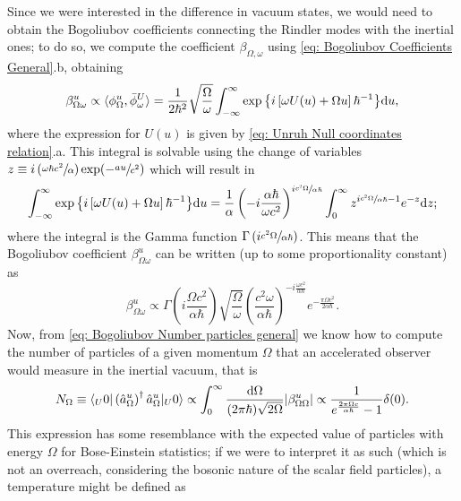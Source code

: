 Since we were interested in the difference in vacuum states, we would need to obtain the Bogoliubov coefficients connecting the Rindler modes with the inertial ones; to do so, we compute the coefficient $\beta_{\Omega,\omega}$ using \ref{eq: Bogoliubov Coefficients General}.b, obtaining
\begin{equation}
	\beta_{\Omega\omega}^u\propto \langle \phi^u_\Omega,\bar\phi_\omega^{U}\rangle=\frac{1}{2\hbar^2}\sqrt{\frac{\Omega}{\omega}}\int_{-\infty}^\infty\exp{\left\{i\left[\omega U(u)+\Omega u\right]\hbar^{-1}\right\}}\text{d} u,
\end{equation}
where the expression for $U(u)$ is given by \ref{eq: Unruh Null coordinates relation}.a. This integral is solvable using the change of variables $z\equiv i\left(\sfrac{\omega\hbar c^2}{\alpha}\right)\exp{\!\left(-\sfrac{a u}{c^2}\right)}$ which will result in
\begin{equation}
	\int_{-\infty}^\infty\exp{\left\{i\left[\omega U(u)+\Omega u\right]\hbar^{-1}\right\}}\text{d} u=\frac{1}{\alpha}\left(-i\frac{\alpha\hbar}{\omega c^2}\right)^{i\sfrac{c^2\Omega}{\alpha\hbar}}\int^\infty_0z^{i\sfrac{c^2\Omega}{\alpha\hbar}-1}e^{-z}\text{d} z;
\end{equation}
where the integral is the Gamma function $\Gamma\left(i\sfrac{c^2\Omega}{\alpha\hbar}\right)$. This means that the Bogoliubov coefficient $\beta_{\Omega\omega}^u$ can be written (up to some proportionality constant) as
\begin{equation}
	\beta_{\Omega\omega}^u\propto \Gamma\left(i\frac{\Omega c^2}{\alpha\hbar }\right)\sqrt{\frac{\Omega}{\omega}}\left(\frac{c^2\omega}{\alpha\hbar }\right)^{-i\frac{\omega c^2}{\alpha\hbar}}e^{-\frac{\pi\Omega c^2}{2\alpha\hbar}}.
\end{equation}
Now, from \ref{eq: Bogoliubov Number particles general} we know how to compute the number of particles of a given momentum $\Omega$ that an accelerated observer would measure in the inertial vacuum, that is
\begin{equation}\label{eq: Bose Distribution Unruh}
	N_\Omega\equiv\langle_U 0|\left(\hat{a}_\Omega^u\right)^\dagger\hat{a}^u_\Omega|_U0\rangle\propto\int_0^\infty\frac{\text{d}\Omega}{(2\pi\hbar)\sqrt{2\Omega}}|\beta^u_{\Omega\Omega}|\propto\frac{1}{e^{\frac{2\pi\Omega c}{\alpha\hbar}}-1}\delta(0).
\end{equation}
This expression has some resemblance with the expected value of particles with energy $\Omega$ for Bose-Einstein statistics; if we were to interpret it as such (which is not an overreach, considering the bosonic nature of the scalar field particles), a temperature might be defined as
